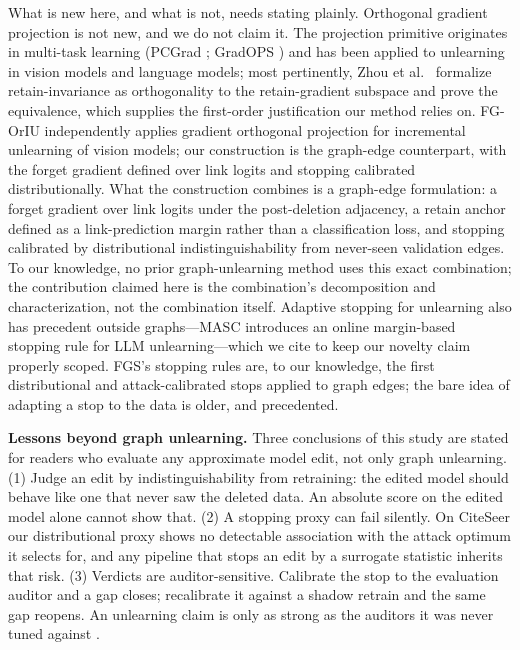 \documentclass[pdflatex,sn-basic,Numbered]{sn-jnl}
\begin{document}
What is new here, and what is not, needs stating plainly. Orthogonal gradient projection is not new, and we do not claim it. The projection primitive originates in multi-task learning (PCGrad \cite{pcgrad2020}; GradOPS \cite{gradops2025}) and has been applied to unlearning in vision models \cite{hoang2024} and language models; most pertinently, Zhou et al.\ \cite{gu2025} formalize retain-invariance as orthogonality to the retain-gradient subspace and prove the equivalence, which supplies the first-order justification our method relies on. FG-OrIU \cite{fgoriu2025} independently applies gradient orthogonal projection for incremental unlearning of vision models; our construction is the graph-edge counterpart, with the forget gradient defined over link logits and stopping calibrated distributionally. What the construction combines is a graph-edge formulation: a forget gradient over link logits under the post-deletion adjacency, a retain anchor defined as a link-prediction margin rather than a classification loss, and stopping calibrated by distributional indistinguishability from never-seen validation edges. To our knowledge, no prior graph-unlearning method uses this exact combination; the contribution claimed here is the combination's decomposition and characterization, not the combination itself. Adaptive stopping for unlearning also has precedent outside graphs---MASC \cite{masc2026} introduces an online margin-based stopping rule for LLM unlearning---which we cite to keep our novelty claim properly scoped. FGS's stopping rules are, to our knowledge, the first distributional and attack-calibrated stops applied to graph edges; the bare idea of adapting a stop to the data is older, and precedented.

\textbf{Lessons beyond graph unlearning.} Three conclusions of this study are stated for readers who evaluate any approximate model edit, not only graph unlearning. (1) Judge an edit by indistinguishability from retraining: the edited model should behave like one that never saw the deleted data. An absolute score on the edited model alone cannot show that. (2) A stopping proxy can fail silently. On CiteSeer our distributional proxy shows no detectable association with the attack optimum it selects for, and any pipeline that stops an edit by a surrogate statistic inherits that risk. (3) Verdicts are auditor-sensitive. Calibrate the stop to the evaluation auditor and a gap closes; recalibrate it against a shadow retrain and the same gap reopens. An unlearning claim is only as strong as the auditors it was never tuned against \cite{ahsan2026,jawandhia2026}.
\end{document}
